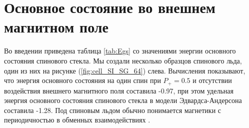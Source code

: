 \documentclass[utf8, babel, sor, jor, amsmath, amssymb, reprint]{elsarticle} %
\begin{document}
\section{Основное состояние во внешнем магнитном поле}



Во введении приведена таблица \ref{tab:Egs} со значениями энергии основного состояния спинового стекла. Мы создали несколько образцов спинового льда, один из них на рисунке (\ref{fig:cell_SI_SG_64}) слева. Вычисления показывают, что энергия основного состояния на один спин при $P_+ = 0.5$ и отсутствии воздействия внешнего магнитного поля составила -0.97, при этом удельная энергия основного состояния спинового стекла в модели Эдвардса-Андерсона составила -1.28. Под спиновым льдом обычно понимается магнетики с периодичностью в обменных взаимодействиях \cite{peretyatko2017interplay, otsuka2018husimi, andriushchenko2019large, shevchenko2017effect, kato2022flux}. 
\end{document}
